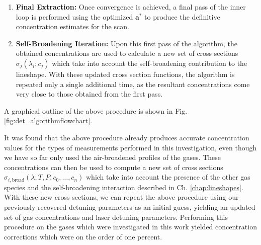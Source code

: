 \documentclass[12pt]{report}
\begin{document}
\begin{enumerate}
		\item \textbf{Final Extraction:} 
		Once convergence is achieved, a final pass of the inner loop is performed using the optimized $\mathbf{a}^*$ to produce the definitive concentration estimates for the scan.
		
		\item \textbf{Self-Broadening Iteration:} Upon this first pass of the algorithm, the obtained concentrations are used to calculate a new set of cross sections $\sigma_j(\lambda_i; c_j)$ which take into account the self-broadening contribution to the lineshape. With these updated cross section functions, the algorithm is repeated only a single additional time, as the resultant concentrations come very close to those obtained from the first pass.
	\end{enumerate}
	
	A graphical outline of the above procedure is shown in Fig. \ref{fig:det_algorithmflowchart}.
	
	It was found that the above procedure already produces accurate concentration values for the types of measurements performed in this investigation, even though we have so far only used the air-broadened profiles of the gases. These concentrations can then be used to compute a new set of cross sections $\sigma_{i,\mathrm{broad}}(\lambda; T, P, c_0, \ldots, c_n)$ which take into account the presence of the other gas species and the self-broadening interaction described in Ch. \ref{chap:lineshapes}. With these new cross sections, we can repeat the above procedure using our previously recovered detuning parameters as an initial guess, yielding an updated set of gas concentrations and laser detuning parameters. Performing this procedure on the gases which were investigated in this work yielded concentration corrections which were on the order of one percent.
	
\end{document}
